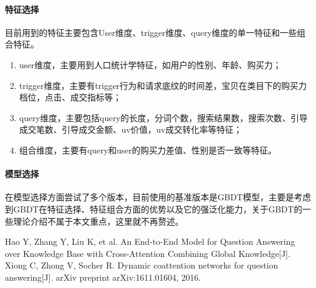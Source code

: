 \paragraph{特征选择}
目前用到的特征主要包含User维度、trigger维度、query维度的单一特征和一些组合特征。
\begin{enumerate}
\item user维度，主要用到人口统计学特征，如用户的性别、年龄、购买力；
\item trigger维度，主要有trigger行为和请求底纹的时间差，宝贝在类目下的购买力档位，点击、成交指标等；
\item query维度，主要包括query的长度，分词个数，搜索结果数，搜索次数、引导成交笔数、引导成交金额、uv价值，uv成交转化率等特征；
\item 组合维度，主要有query和user的购买力差值、性别是否一致等特征。
\end{enumerate}
\paragraph{模型选择}
在模型选择方面尝试了多个版本，目前使用的基准版本是GBDT模型，主要是考虑到GBDT在特征选择、特征组合方面的优势以及它的强泛化能力，关于GBDT的一些理论介绍不属于本文重点，这里就不再赘述。




 \begin{thebibliography}{99}
 Hao Y, Zhang Y, Liu K, et al. An End-to-End Model for Question Answering over Knowledge Base with Cross-Attention Combining Global Knowledge[J].
 Xiong C, Zhong V, Socher R. Dynamic coattention networks for question answering[J]. arXiv preprint arXiv:1611.01604, 2016.
\end{thebibliography}

